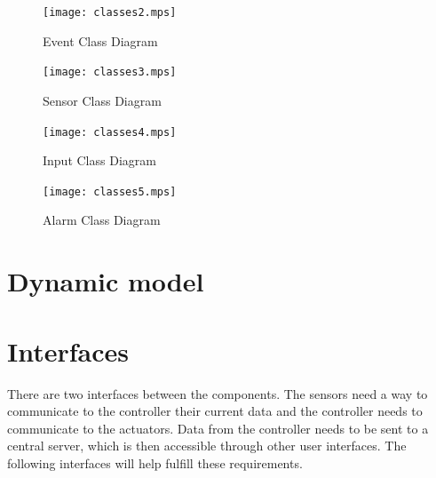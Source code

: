 \documentclass{report}
\begin{document}
\begin{landscape}
\begin{figure}[hp]
    \centering
        \caption{Event Class Diagram}
        \scriptsize
        \setlength{\unitlength}{2.0em}
        \texttt{[image: classes2.mps]}
        \normalsize
    \label{fig:event_class_diagram}
\end{figure}
\end{landscape}

\begin{landscape}
\begin{figure}[hp]
    \centering
        \caption{Sensor Class Diagram}
        \scriptsize
        \setlength{\unitlength}{2.0em}
        \texttt{[image: classes3.mps]}
        \normalsize
    \label{fig:sensor_class_diagram}
\end{figure}
\end{landscape}

\begin{figure}[hp]
    \centering
        \caption{Input Class Diagram}
        \scriptsize
        \setlength{\unitlength}{2.0em}
        \texttt{[image: classes4.mps]}
        \normalsize
    \label{fig:input_class_diagram}
\end{figure}

\begin{landscape}
\begin{figure}[hp]
    \centering
        \caption{Alarm Class Diagram}
        \scriptsize
        \setlength{\unitlength}{2.0em}
        \texttt{[image: classes5.mps]}
        \normalsize
    \label{fig:alarm_class_diagram}
\end{figure}
\end{landscape}



\section{Dynamic model}


\section{Interfaces}
There are two interfaces between the components. The sensors need a way to
communicate to the controller their current data and the controller needs to
communicate to the actuators. Data from the controller needs to be sent to a
central server, which is then accessible through other user interfaces. The following
interfaces will help fulfill these requirements.
\end{document}
